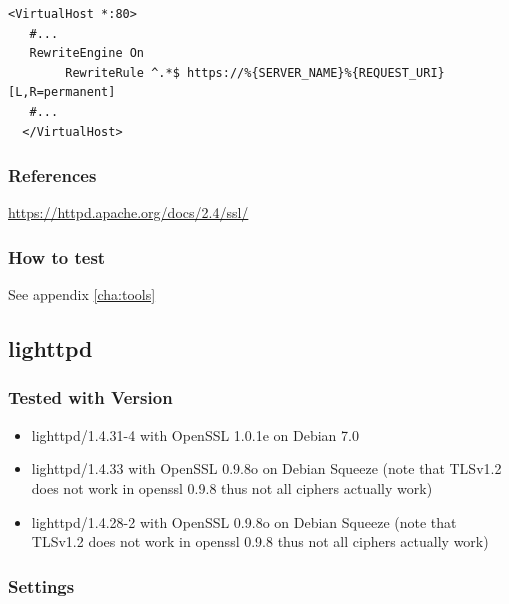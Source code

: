 \begin{lstlisting}[breaklines]
  <VirtualHost *:80>
   #...
   RewriteEngine On
        RewriteRule ^.*$ https://%{SERVER_NAME}%{REQUEST_URI} [L,R=permanent]
   #...
  </VirtualHost>
\end{lstlisting}


\subsubsection{References}
\url{https://httpd.apache.org/docs/2.4/ssl/}


\subsubsection{How to test}

See appendix \ref{cha:tools}



\subsection{lighttpd}



\subsubsection{Tested with Version}
\begin{itemize}
\item lighttpd/1.4.31-4 with OpenSSL 1.0.1e on Debian 7.0
\item lighttpd/1.4.33 with OpenSSL 0.9.8o on Debian Squeeze (note that TLSv1.2 does not work in openssl 0.9.8 thus not all ciphers actually work)
\item lighttpd/1.4.28-2 with OpenSSL 0.9.8o on Debian Squeeze (note that TLSv1.2 does not work in openssl 0.9.8 thus not all ciphers actually work)
\end{itemize}


\subsubsection{Settings}


